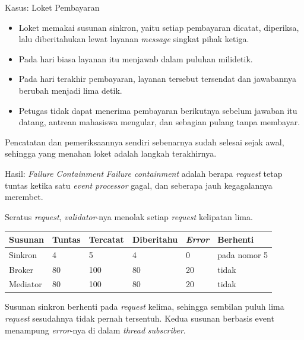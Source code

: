 \documentclass[aspectratio=169, table, 12pt]{beamer}
\begin{document}
\begin{frame}{{\Large Kasus: Loket Pembayaran}}
  \vspace{10pt}
  \begin{itemize}\small
    \item Loket memakai susunan sinkron, yaitu setiap pembayaran dicatat,
          diperiksa, lalu diberitahukan lewat layanan \textit{message} singkat pihak
          ketiga.
    \item Pada hari biasa layanan itu menjawab dalam puluhan milidetik.
    \item Pada hari terakhir pembayaran, layanan tersebut tersendat dan
          jawabannya berubah menjadi lima detik.
    \item Petugas tidak dapat menerima pembayaran berikutnya sebelum jawaban itu
          datang, antrean mahasiswa mengular, dan sebagian pulang tanpa
          membayar.
  \end{itemize}

  \vspace{10pt}
  {\small Pencatatan dan pemeriksaannya sendiri sebenarnya sudah selesai sejak
  awal, sehingga yang menahan loket adalah langkah terakhirnya.}
\end{frame}

\begin{frame}{{\Large Hasil: \textit{Failure Containment}}}
  \vspace{6pt}
  {\small \textit{Failure containment} adalah berapa \textit{request} tetap
  tuntas ketika satu \textit{event processor} gagal, dan seberapa jauh
  kegagalannya merembet.}

  \vspace{4pt}
  {\small Seratus \textit{request}, \textit{validator}-nya menolak setiap \textit{request} kelipatan
  lima.}

  \vspace{6pt}
  \centering
  \small
  \begin{tabularx}{0.96\textwidth}{|l|l|l|l|l|X|}
    \hline
    \textbf{Susunan} & \textbf{Tuntas} & \textbf{Tercatat} & \textbf{Diberitahu} & \textbf{\textit{Error}} & \textbf{Berhenti} \\
    \hline
    Sinkron & 4 & 5 & 4 & 0 & pada nomor 5 \\
    \hline
    Broker & 80 & 100 & 80 & 20 & tidak \\
    \hline
    Mediator & 80 & 100 & 80 & 20 & tidak \\
    \hline
  \end{tabularx}

  \vspace{6pt}
  \raggedright
  {\small Susunan sinkron berhenti pada \textit{request} kelima, sehingga sembilan
  puluh lima \textit{request} sesudahnya tidak pernah tersentuh. Kedua susunan
  berbasis event menampung \textit{error}-nya di dalam \textit{thread} \textit{subscriber}.}
\end{frame}
\end{document}
